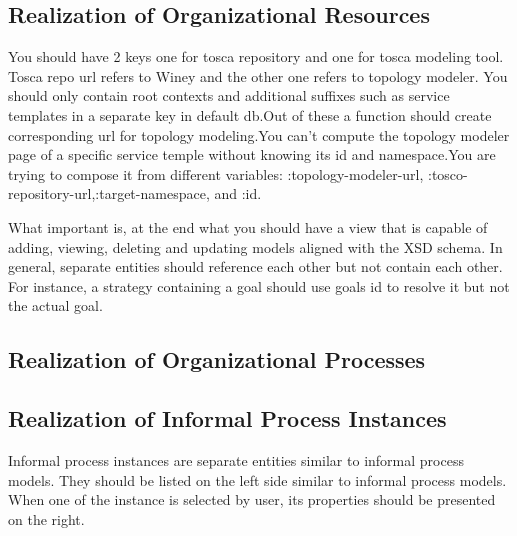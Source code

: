 \subsection{Realization of Organizational Resources}
You should have 2 keys one for tosca repository and one for tosca modeling tool. Tosca repo url refers to Winey and the other one refers to topology modeler. You should only contain root contexts and additional suffixes such as service templates in a separate key in default db.Out of these a function should create corresponding url for topology modeling.You can’t compute the topology modeler page of a specific service temple without knowing its id and namespace.You are trying to compose it from different variables: :topology-modeler-url, :tosco-repository-url,:target-namespace, and :id.


	
	
	What important is, at the end what you should have a view that is capable of adding, viewing, deleting and updating models aligned with the XSD schema. In general, separate entities should reference each other but not contain each other. For instance, a strategy containing a goal should use goals id to resolve it but not the actual goal.
	
	
	\subsection{Realization of Organizational Processes}
	
	
	\subsection{Realization of Informal Process Instances}
	Informal process instances are separate entities similar to informal process models. They should be listed on the left side similar to informal process models. When one of the instance is selected by user, its properties should be presented on the right.
	
